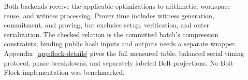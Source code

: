 Both backends receive the applicable optimizations to arithmetic,
workspace reuse, and witness processing. Prover time includes witness generation,
commitment, and proving, but excludes setup, verification, and outer
serialization.
The checked relation is the committed batch's compression constraints;
binding public hash inputs and outputs needs a separate wrapper.
Appendix~\ref{app:flock-details} gives the full measured table, balanced
serial timing protocol, phase breakdowns, and separately labeled Bolt
projections. No Bolt--Flock implementation was benchmarked.
\FloatBarrier
